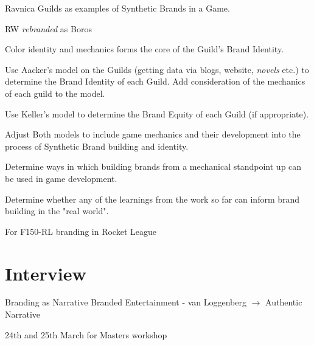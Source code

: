 Ravnica Guilds as examples of Synthetic Brands in a Game.

RW \emph{rebranded} as Boros

Color identity and mechanics forms the core of the Guild's Brand Identity.

Use Aacker's model on the Guilds (getting data via blogs, website, \emph{novels} etc.) to determine the Brand Identity of each Guild. Add consideration of the mechanics of each guild to the model.

Use Keller's model to determine the Brand Equity of each Guild (if appropriate).

Adjust Both models to include game mechanics and their development into the process of Synthetic Brand building and identity.

Determine ways in which building brands from a mechanical standpoint up can be used in game development.

Determine whether any of the learnings from the work so far can inform brand building in the "real world".

For F150-RL branding in Rocket League


\section{Interview}

Branding as Narrative
Branded Entertainment - van Loggenberg $\rightarrow$ Authentic Narrative

24th and 25th March for Masters workshop